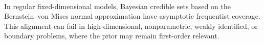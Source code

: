 \begin{remark} \label{rem:bayes-frequentist-alignment-and-limits} \\
In regular fixed-dimensional models, Bayesian credible sets based on the Bernstein--von Mises normal approximation have asymptotic frequentist coverage. This alignment can fail in high-dimensional, nonparametric, weakly identified, or boundary problems, where the prior may remain first-order relevant.
\end{remark}
